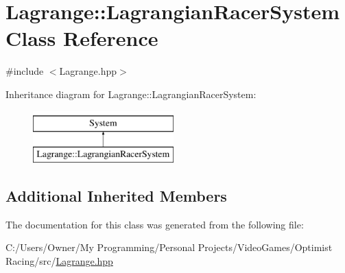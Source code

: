 \hypertarget{class_lagrange_1_1_lagrangian_racer_system}{\section{Lagrange\-:\-:Lagrangian\-Racer\-System Class Reference}
\label{class_lagrange_1_1_lagrangian_racer_system}
}


{\ttfamily \#include $<$Lagrange.\-hpp$>$}

Inheritance diagram for Lagrange\-:\-:Lagrangian\-Racer\-System\-:\begin{figure}[H]
\begin{center}
\leavevmode
\includegraphics[height=2.000000cm]{class_lagrange_1_1_lagrangian_racer_system}
\end{center}
\end{figure}
\subsection*{Additional Inherited Members}


The documentation for this class was generated from the following file\-:\begin{DoxyCompactItemize}
\item 
C\-:/\-Users/\-Owner/\-My Programming/\-Personal Projects/\-Video\-Games/\-Optimist Racing/src/\hyperlink{_lagrange_8hpp}{Lagrange.\-hpp}\end{DoxyCompactItemize}
